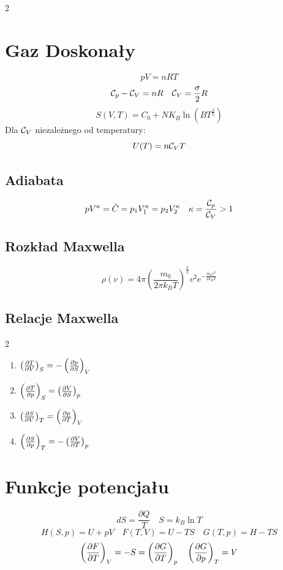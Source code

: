 \documentclass{../konspekt}
\begin{document}
\begin{multicols}{2}
  \section{Gaz Doskonały}
  $$
  pV = nRT
  $$
  $$
  \mathcal{C}_p - \mathcal{C}_V = nR \quad \mathcal{C}_V = \frac{\sigma}{2}R
  $$
  $$
  S(V, T) = C_0 + NK_B\ln(BT^{\frac{3}{2}})
  $$
  Dla $\mathcal{C}_V$ niezależnego od temperatury:
  $$
  U(T) = n\mathcal{C}_VT
  $$
  \vspace{-3em}

  \subsection{Adiabata}
  $$
  pV^\kappa = \tilde{C} = p_1V_1^\kappa = p_2V_2^\kappa \quad
  \kappa = \frac{\mathcal{C}_p}{\mathcal{C}_V} > 1
  $$
  \vspace{-2em}

  \subsection{Rozkład Maxwella}
  $$
  \rho(v) = 4 \pi \left(\frac{m_0}{2\pi k_BT}\right)^{\frac{3}{2}} v^2
  e^{-\frac{m_0v^2}{2k_BT}}
  $$
  \vspace{-2em}

  \subsection{Relacje Maxwella}
  \begin{multicols}{2}
    \begin{enumerate}
      \item $\left(\frac{\partial T}{\partial V}\right)_S = -\left(\frac{\partial p}{\partial S}\right)_V$
      \item $\left(\frac{\partial T}{\partial p}\right)_S = \left(\frac{\partial V}{\partial S}\right)_p$
      \item $\left(\frac{\partial S}{\partial V}\right)_T = \left(\frac{\partial p}{\partial T}\right)_V$
      \item $\left(\frac{\partial S}{\partial p}\right)_T = - \left(\frac{\partial V}{\partial T}\right)_p$
    \end{enumerate}
  \end{multicols}
  \vspace{-2em}

  \section{Funkcje potencjału}
  $$
  dS = \frac{\partial Q}{T} \quad S = k_B \ln T
  $$
  $$
  H(S, p) = U + pV \quad F(T, V) = U - TS \quad G(T, p) = H - TS
  $$
  $$
  \left(\frac{\partial F}{\partial T}\right)_V = -S = \left(\frac{\partial G}{\partial T}\right)_p \quad \left(\frac{\partial G}{\partial p}\right)_T = V
  $$
  \vspace{-2em}


\end{multicols}
\end{document}

